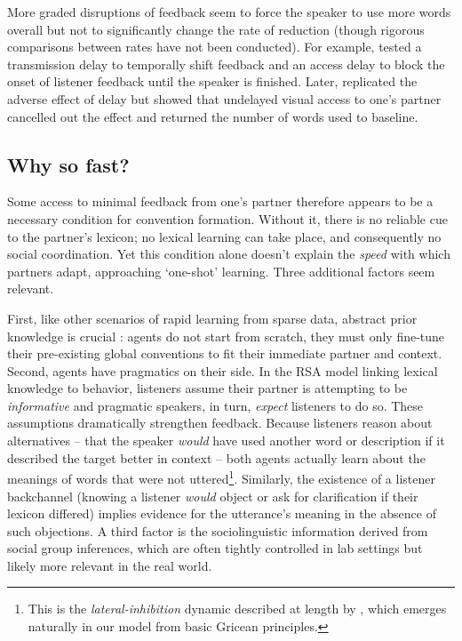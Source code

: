 \documentclass[11pt, floatsintext, jou]{apa6}
\begin{document}
More graded disruptions of feedback seem to force the speaker to use more words overall but not to significantly change the rate of reduction (though rigorous comparisons between rates have not been conducted). For example,  tested a transmission delay to temporally shift feedback and an access delay to block the onset of listener feedback until the speaker is finished. Later,  replicated the adverse effect of delay but showed that undelayed visual access to one's partner cancelled out the effect and returned the number of words used to baseline. 


\subsection{Why so fast?}

Some access to minimal feedback from one's partner therefore appears to be a necessary condition for convention formation. Without it, there is no reliable cue to the partner's lexicon; no lexical learning can take place, and consequently no social coordination. Yet this condition alone doesn't explain the \emph{speed} with which partners adapt, approaching `one-shot' learning. Three additional factors seem relevant. 

First, like other scenarios of rapid learning from sparse data, abstract prior knowledge is crucial \cite{TenenbaumKempGriffithsGoodman11_Grow_a_Mind_Science,LakeEtAl16_BuildingMachines}: agents do not start from scratch, they must only fine-tune their pre-existing global conventions to fit their immediate partner and context. Second, agents have pragmatics on their side. In the RSA model linking lexical knowledge to behavior, listeners assume their partner is attempting to be \emph{informative} and pragmatic speakers, in turn, \emph{expect} listeners to do so. These assumptions dramatically strengthen feedback. Because listeners reason about alternatives -- that the speaker \emph{would} have used another word or description if it described the target better in context -- both agents actually learn about the meanings of words that were not uttered\footnote{
This is the \emph{lateral-inhibition} dynamic described at length by , which emerges naturally in our model from basic Gricean principles.
}. Similarly, the existence of a listener backchannel (knowing a listener \emph{would} object or ask for clarification if their lexicon differed) implies evidence for the utterance's meaning in the absence of such objections. A third factor is the sociolinguistic information derived from social group inferences, which are often tightly controlled in lab settings but likely more relevant in the real world. 
\end{document}
